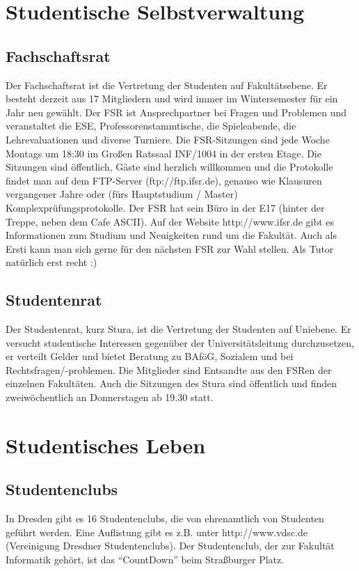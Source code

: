 \documentclass[a4paper,12pt]{report}
\begin{document}
\section{Studentische Selbstverwaltung}
\subsection{Fachschaftsrat}
Der Fachschaftsrat ist die Vertretung der Studenten auf Fakultätsebene. Er besteht derzeit aus 17 Mitgliedern und wird immer im Wintersemester für ein Jahr neu gewählt. Der FSR ist Ansprechpartner bei Fragen und Problemen und veranstaltet die ESE, Professorenstammtische, die Spieleabende, die Lehrevaluationen und diverse Turniere. Die FSR-Sitzungen sind jede Woche Montags um 18:30 im Großen Ratssaal INF/1004 in der ersten Etage. Die Sitzungen sind öffentlich, Gäste sind herzlich willkommen und die Protokolle findet man auf dem FTP-Server (ftp://ftp.ifsr.de), genauso wie Klausuren vergangener Jahre oder (fürs Hauptstudium / Master) Komplexprüfungsprotokolle. Der FSR hat sein Büro in der E17 (hinter der Treppe, neben dem Cafe ASCII). Auf der Website http://www.ifsr.de gibt es Informationen zum Studium und Neuigkeiten rund um die Fakultät. Auch als Ersti kann man sich gerne für den nächsten FSR zur Wahl stellen. Als Tutor natürlich erst recht :)

\subsection{Studentenrat}
Der Studentenrat, kurz Stura, ist die Vertretung der Studenten auf Uniebene. Er versucht studentische Interessen gegenüber der Universitätsleitung durchzusetzen, er verteilt Gelder und bietet Beratung zu BAföG, Sozialem und bei Rechtsfragen/-problemen. Die Mitglieder sind Entsandte aus den FSRen der einzelnen Fakultäten. Auch die Sitzungen des Stura sind öffentlich und finden zweiwöchentlich an Donnerstagen ab 19.30 statt.

\section{Studentisches Leben}
\subsection{Studentenclubs}
In Dresden gibt es 16 Studentenclubs, die von ehrenamtlich von Studenten geführt werden. Eine Auflistung gibt es z.B. unter http://www.vdsc.de (Vereinigung Dresdner Studentenclubs). Der Studentenclub, der zur Fakultät Informatik gehört, ist das ``CountDown'' beim Straßburger Platz.
\end{document}
